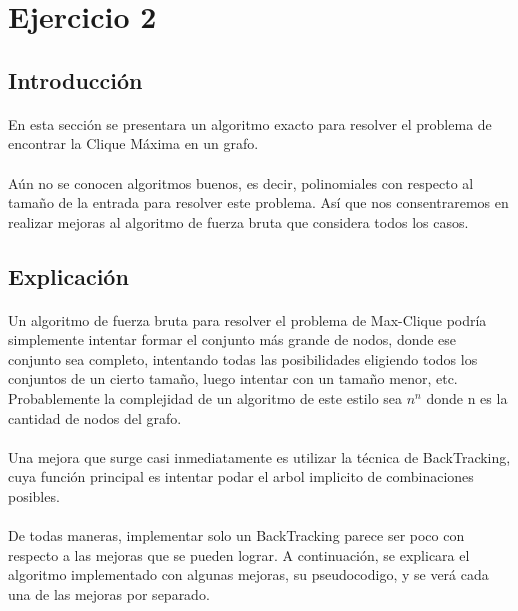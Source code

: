 \section{Ejercicio 2}

\subsection{Introducción}

\paragraph{}
En esta sección se presentara un algoritmo exacto para resolver el problema de encontrar la Clique Máxima en un grafo.

\paragraph{}
Aún no se conocen algoritmos buenos, es decir, polinomiales con respecto al tamaño de la entrada para resolver 
este problema. Así que nos consentraremos en realizar mejoras al algoritmo de fuerza bruta que considera todos los casos.


\subsection{Explicación}

\paragraph{}
Un algoritmo de fuerza bruta para resolver el problema de Max-Clique podría simplemente intentar formar el conjunto más 
grande de nodos, donde ese conjunto sea completo, intentando todas las posibilidades eligiendo todos los conjuntos de un cierto tamaño,
luego intentar con un tamaño menor, etc. Probablemente la complejidad de un algoritmo de este estilo sea $n^n$ donde n es la cantidad 
de nodos del grafo.

\paragraph{}
Una mejora que surge casi inmediatamente es utilizar la técnica de BackTracking, cuya función principal es intentar podar el 
arbol implicito de combinaciones posibles. 

\paragraph{}
De todas maneras, implementar solo un BackTracking parece ser poco con respecto a las mejoras que se pueden lograr. A continuación, se explicara el algoritmo implementado con algunas mejoras, su pseudocodigo, y se verá cada una de las mejoras por separado.


